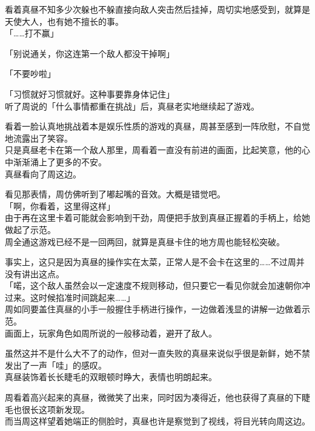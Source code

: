 看着真昼不知多少次躲也不躲直接向敌人突击然后挂掉，周切实地感受到，就算是天使大人，也有她不擅长的事。\\

「……打不赢」

「别说通关，你这连第一个敌人都没干掉啊」

「不要吵啦」

「习惯就好习惯就好。这种事要靠身体记住」\\

听了周说的「什么事情都重在挑战」后，真昼老实地继续起了游戏。

看着一脸认真地挑战着本是娱乐性质的游戏的真昼，周甚至感到一阵欣慰，不自觉地流露出了笑容。\\

只是真昼老卡在第一个敌人那里，周看着一直没有前进的画面，比起笑意，他的心中渐渐涌上了更多的不安。\\

真昼看向了周这边。

看见那表情，周仿佛听到了嘟起嘴的音效。大概是错觉吧。\\

「啊，你看着，这里得这样」\\

由于再在这里卡着可能就会影响到干劲，周便把手放到真昼正握着的手柄上，给她做起了示范。\\

周全通这游戏已经不是一回两回，就算是真昼卡住的地方周也能轻松突破。

事实上，这只是因为真昼的操作实在太菜，正常人是不会卡在这里的……不过周并没有讲出这点。\\

「喏，这个敌人虽然会以一定速度不规则移动，但只要它一看见你就会加速朝你冲过来。这时候掐准时间跳起来……」\\

周如同要盖住真昼的小手一般握住手柄进行操作，一边做着浅显的讲解一边做着示范。\\

画面上，玩家角色如周所说的一般移动着，避开了敌人。

虽然这并不是什么大不了的动作，但对一直失败的真昼来说似乎很是新鲜，她不禁发出了一声「哇」的感叹。\\

真昼装饰着长长睫毛的双眼顿时睁大，表情也明朗起来。

周看着高兴起来的真昼，微微笑了出来，同时因为凑得近，他也获得了真昼的下睫毛也很长这项新发现。\\

而当周这样望着她端正的侧脸时，真昼也许是察觉到了视线，将目光转向周这边。\\

